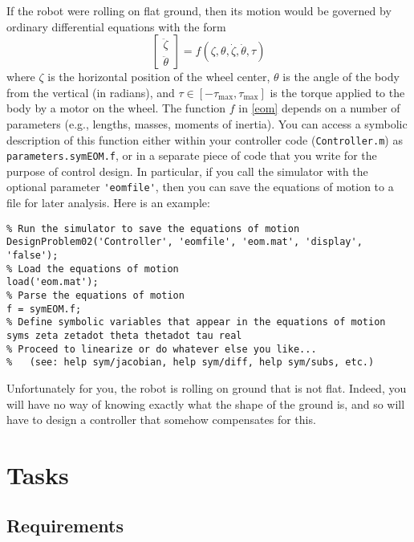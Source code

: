 \documentclass[conf]{new-aiaa}
\begin{document}
If the robot were rolling on flat ground, then its motion would be governed by ordinary differential equations with the form
\begin{equation}
\label{eom}
\begin{bmatrix} \ddot{\zeta} \\ \ddot{\theta} \end{bmatrix}
= f\left(\zeta, \theta, \dot{\zeta}, \dot{\theta}, \tau\right)
\end{equation}
where $\zeta$ is the horizontal position of the wheel center, $\theta$ is the angle of the body from the vertical (in radians), and $\tau \in [-\tau_\text{max}, \tau_\text{max}]$ is the torque applied to the body by a motor on the wheel. The function $f$ in \eqref{eom} depends on a number of parameters (e.g., lengths, masses, moments of inertia). You can access a symbolic description of this function either within your controller code (\lstinline|Controller.m|) as \lstinline|parameters.symEOM.f|, or in a separate piece of code that you write for the purpose of control design. In particular, if you call the simulator with the optional parameter \lstinline|'eomfile'|, then you can save the equations of motion to a file for later analysis. Here is an example:
\begin{lstlisting}
% Run the simulator to save the equations of motion
DesignProblem02('Controller', 'eomfile', 'eom.mat', 'display', 'false');
% Load the equations of motion
load('eom.mat');
% Parse the equations of motion
f = symEOM.f;
% Define symbolic variables that appear in the equations of motion
syms zeta zetadot theta thetadot tau real
% Proceed to linearize or do whatever else you like...
% 	(see: help sym/jacobian, help sym/diff, help sym/subs, etc.)
\end{lstlisting}
Unfortunately for you, the robot is rolling on ground that is not flat. Indeed, you will have no way of knowing exactly what the shape of the ground is, and so will have to design a controller that somehow compensates for this.

\section{Tasks}

\subsection{Requirements}
\label{secRequirements}
\end{document}
